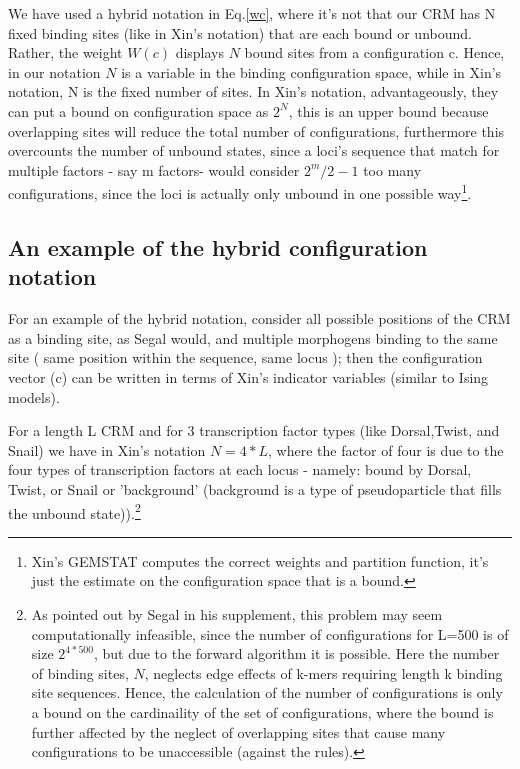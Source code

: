 We have used a hybrid notation in Eq.\ref{wc}, where it's not that our CRM has N fixed binding sites (like in Xin's notation) that are each bound or unbound.  Rather, the weight $W(c)$ displays $N$ bound sites from a configuration c.  Hence, in our notation $N$ is a variable in the binding configuration space, while in Xin's notation, N is the fixed number of sites.  In Xin's notation, advantageously, they can put a bound on configuration space as $2^N$, this is an upper bound because overlapping sites will reduce the total number of configurations, furthermore this overcounts the number of unbound states, since a loci's sequence that match for multiple factors - say m factors- would consider $2^m/2-1$ too many configurations, since the loci is actually only unbound in one possible way\footnote{Xin's GEMSTAT computes the correct weights and partition function, it's just the estimate on the configuration space that is a bound.}.   
\subsection{ An example of the hybrid configuration notation} 
For an example of the hybrid notation, consider all possible positions of the CRM as a binding site, as Segal would, and multiple morphogens binding to the same site ( same position within the sequence, same locus ); then the configuration vector (c) can be written in terms of Xin's indicator variables (similar to Ising models).  
 
For a length L CRM and for 3 transcription factor types (like Dorsal,Twist, and Snail) we have in Xin's notation $N =4*L$, where the factor of four is due to the four types of transcription factors at each locus - namely: bound by Dorsal, Twist, or Snail or 'background' (background is a type of pseudoparticle that fills the unbound state)).\footnote{As pointed out by Segal in his supplement, this problem may seem computationally infeasible, since the number of configurations for L=500 is of size $2^{4*500}$, but due to the forward algorithm it is possible.  Here the number of binding sites, $N$, neglects edge effects of k-mers requiring length k binding site sequences.  Hence, the calculation of the number of configurations is only a bound on the cardinaility of the set of configurations, where the bound is further affected by the neglect of overlapping sites that cause many configurations to be unaccessible (against the rules). } 

